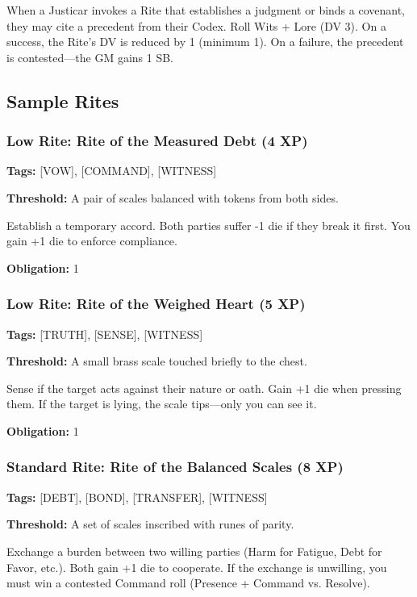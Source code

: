 When a Justicar invokes a Rite that establishes a judgment or binds a covenant, they may cite a precedent from their Codex. Roll Wits + Lore (DV 3). On a success, the Rite's DV is reduced by 1 (minimum 1). On a failure, the precedent is contested—the GM gains 1 SB.

\subsection{Sample Rites}

\subsubsection{Low Rite: Rite of the Measured Debt (4 XP)}

\textbf{Tags:} [VOW], [COMMAND], [WITNESS]

\textbf{Threshold:} A pair of scales balanced with tokens from both sides.

Establish a temporary accord. Both parties suffer -1 die if they break it first. You gain +1 die to enforce compliance.

\textbf{Obligation:} 1

\subsubsection{Low Rite: Rite of the Weighed Heart (5 XP)}

\textbf{Tags:} [TRUTH], [SENSE], [WITNESS]

\textbf{Threshold:} A small brass scale touched briefly to the chest.

Sense if the target acts against their nature or oath. Gain +1 die when pressing them. If the target is lying, the scale tips—only you can see it.

\textbf{Obligation:} 1

\subsubsection{Standard Rite: Rite of the Balanced Scales (8 XP)}

\textbf{Tags:} [DEBT], [BOND], [TRANSFER], [WITNESS]

\textbf{Threshold:} A set of scales inscribed with runes of parity.

Exchange a burden between two willing parties (Harm for Fatigue, Debt for Favor, etc.). Both gain +1 die to cooperate. If the exchange is unwilling, you must win a contested Command roll (Presence + Command vs. Resolve).

